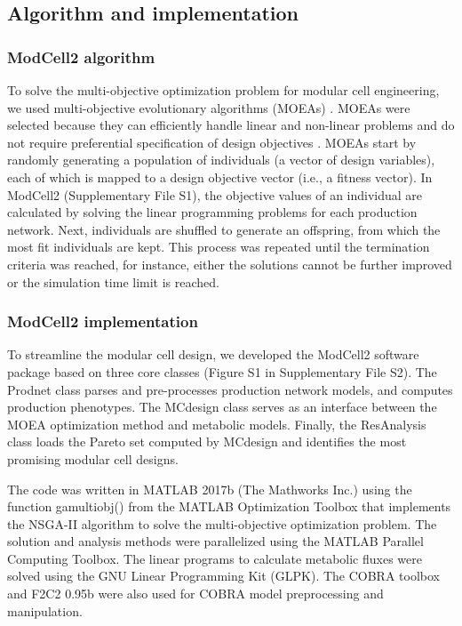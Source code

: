 \subsection{Algorithm and implementation}

\subsubsection{ModCell2 algorithm}
To solve the multi-objective
optimization problem for modular cell engineering, we used
multi-objective evolutionary algorithms (MOEAs)
\citep{coello2002}. MOEAs were selected because they can
efficiently handle linear and non-linear problems and do not require
preferential specification of design objectives
\citep{marler2004}. MOEAs start by randomly generating a
population of individuals (a vector of design variables), each of which
is mapped to a design objective vector (i.e., a fitness vector). In
ModCell2 (Supplementary File S1), the objective values of an individual
are calculated by solving the linear programming problems for each
production network. Next, individuals are shuffled to generate an
offspring, from which the most fit individuals are kept. This process
was repeated until the termination criteria was reached, for instance,
either the solutions cannot be further improved or the simulation time
limit is reached.

\subsubsection{ModCell2 implementation}
To streamline the modular cell
design, we developed the ModCell2 software package based on three core
classes (Figure S1 in Supplementary File S2). The Prodnet class parses
and pre-processes production network models, and computes production
phenotypes. The MCdesign class serves as an interface between the MOEA
optimization method and metabolic models. Finally, the ResAnalysis class
loads the Pareto set computed by MCdesign and identifies the most
promising modular cell designs.

The code was written in MATLAB 2017b (The Mathworks Inc.) using the function gamultiobj() from the MATLAB Optimization Toolbox that implements the NSGA-II algorithm \citep{deb2002} to solve the multi-objective optimization problem.
The solution and analysis methods were parallelized using the MATLAB Parallel Computing Toolbox.
The linear programs to calculate metabolic fluxes were solved using the GNU Linear Programming Kit (GLPK).
The COBRA toolbox \citep{heirendt2017, schellenberger2011} and F2C2 0.95b \citep{larhlimi2012} were also used for COBRA model preprocessing and manipulation.

